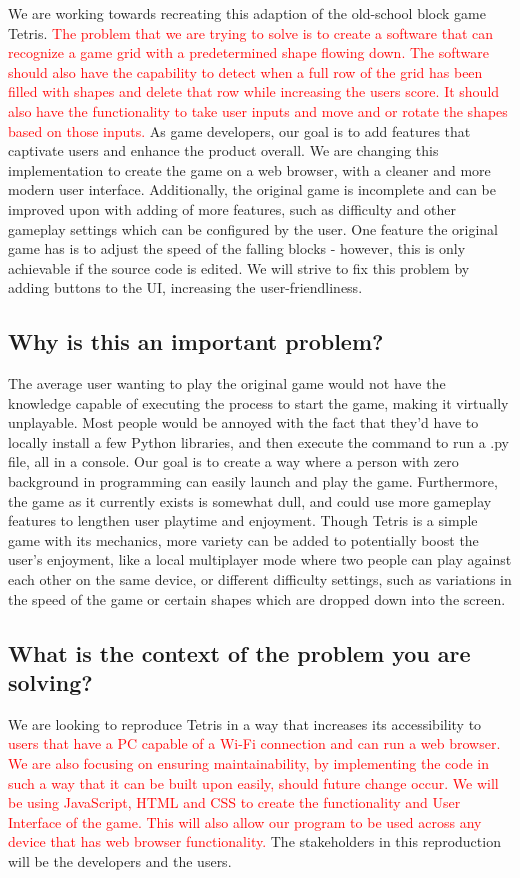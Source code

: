 \documentclass[11pt, oneside]{article}   	%
\begin{document}
\newcommand*\apos{\textsc{\char13}}
We are working towards recreating this adaption of the old-school block game Tetris. \textcolor{red}{The problem that we are trying to solve is to create a software that can recognize a game grid with a predetermined shape flowing down. The software should also have the capability to detect when a full row of the grid has been filled with shapes and delete that row while increasing the users score. It should also have the functionality to take user inputs and move and or rotate the shapes based on those inputs.} As game developers, our goal is to add features that captivate users and enhance the product overall. We are changing this implementation to create the game on a web browser, with a cleaner and more modern user interface. Additionally, the original game is incomplete and can be improved upon with adding of more features, such as difficulty and other gameplay settings which can be configured by the user. One feature the original game has is to adjust the speed of the falling blocks - however, this is only achievable if the source code is edited. We will strive to fix this problem by adding buttons to the UI, increasing the user-friendliness.
\subsection{Why is this an important problem?}

The average user wanting to play the original game would not have the knowledge capable of executing the process to start the game, making it virtually unplayable. Most people would be annoyed with the fact that they’d have to locally install a few Python libraries, and then execute the command to run a .py file, all in a console. Our goal is to create a way where a person with zero background in programming can easily launch and play the game. Furthermore, the game as it currently exists is somewhat dull, and could use more gameplay features to lengthen user playtime and enjoyment. Though Tetris is a simple game with its mechanics, more variety can be added to potentially boost the user’s enjoyment, like a local multiplayer mode where two people can play against each other on the same device, or different difficulty settings, such as variations in the speed of the game or certain shapes which are dropped down into the screen.

\subsection{What is the context of the problem you are solving?}

We are looking to reproduce Tetris in a way that increases its accessibility to \textcolor{red}{users that have a PC capable of a Wi-Fi connection and can run a web browser. We are also focusing on ensuring maintainability, by implementing the code in such a way that it can be built upon easily, should future change occur. We will be using JavaScript, HTML and CSS to create the functionality and User Interface of the game. This will also allow our program to be used across any device that has web browser functionality.} The stakeholders in this reproduction will be the developers and the users. 
\end{document}
